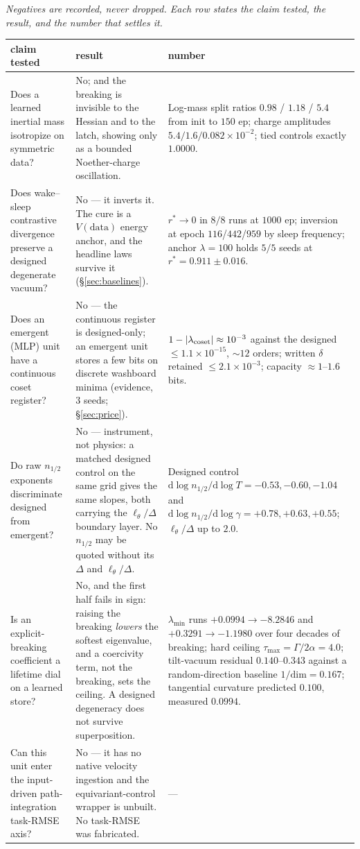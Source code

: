 \documentclass{article}
\begin{document}
\emph{Negatives are recorded, never dropped. Each row states the claim tested, the result, and the number that settles it.}

\begin{center}\scriptsize
\begin{tabular}{@{}p{1.52in} p{1.52in} p{2.06in}@{}}
\toprule
claim tested & result & number \\
\midrule
Does a learned inertial mass isotropize on symmetric data? &
No; and the breaking is invisible to the Hessian and to the latch, showing only as a bounded Noether-charge oscillation.   &
Log-mass split ratios $0.98$ / $1.18$ / $5.4$ from init to $150$ ep; charge amplitudes $5.4/1.6/0.082{\times}10^{-2}$; tied controls exactly $1.0000$. \\[2pt]
Does wake--sleep contrastive divergence preserve a designed degenerate vacuum? &
No --- it inverts it. The cure is a $V(\text{data})$ energy anchor, and the headline laws survive it (\S\ref{sec:baselines}). &
$r^*\to0$ in $8/8$ runs at $1000$ ep; inversion at epoch $116$/$442$/$959$ by sleep frequency; anchor $\lambda{=}100$ holds $5/5$ seeds at $r^*{=}0.911\pm0.016$. \\[2pt]
Does an emergent (MLP) unit have a continuous coset register? &
No --- the continuous register is designed-only; an emergent unit stores a few bits on discrete washboard minima (evidence, $3$ seeds; \S\ref{sec:price}). &
$1-|\lambda_{\rm coset}|\approx10^{-3}$ against the designed $\le1.1{\times}10^{-15}$, $\sim\!12$ orders; written $\delta$ retained $\le2.1{\times}10^{-3}$; capacity $\approx1$--$1.6$ bits. \\[2pt]
Do raw $n_{1/2}$ exponents discriminate designed from emergent? &
No --- instrument, not physics: a matched designed control on the same grid gives the same slopes, both carrying the $\ell_\theta/\Delta$ boundary layer. No $n_{1/2}$ may be quoted without its $\Delta$ and $\ell_\theta/\Delta$. &
Designed control $\mathrm{d}\log n_{1/2}/\mathrm{d}\log T=-0.53,-0.60,-1.04$ and $\mathrm{d}\log n_{1/2}/\mathrm{d}\log\gamma=+0.78,+0.63,+0.55$; $\ell_\theta/\Delta$ up to $2.0$. \\[2pt]
Is an explicit-breaking coefficient a lifetime dial on a learned store? &
No, and the first half fails in sign: raising the breaking \emph{lowers} the softest eigenvalue, and a coercivity term, not the breaking, sets the ceiling. A designed degeneracy does not survive superposition. &
$\lambda_{\min}$ runs $+0.0994\to-8.2846$ and $+0.3291\to-1.1980$ over four decades of breaking; hard ceiling $\tau_{\max}=\Gamma/2\alpha=4.0$; tilt-vacuum residual $0.140$--$0.343$ against a random-direction baseline $1/\mathrm{dim}=0.167$; tangential curvature predicted $0.100$, measured $0.0994$. \\[2pt]
Can this unit enter the input-driven path-integration task-RMSE axis? &
No --- it has no native velocity ingestion and the equivariant-control wrapper is unbuilt. No task-RMSE was fabricated. &
--- \\[2pt]
\bottomrule
\end{tabular}
\end{center}
\end{document}
